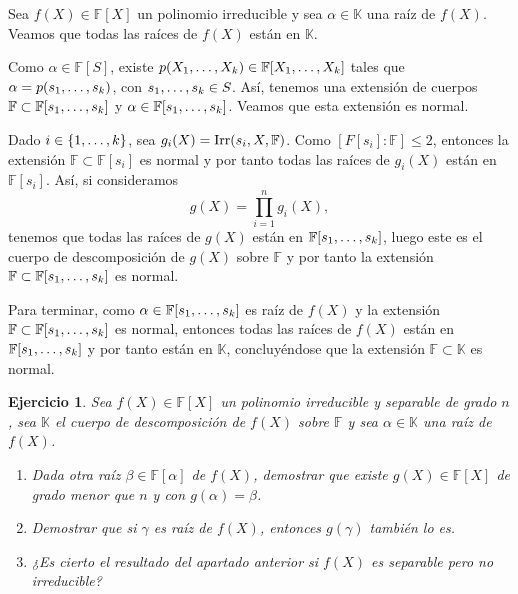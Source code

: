 \documentclass[11pt]{report}
\makeatletter
\renewenvironment{proof}[1][\proofname]{\par
  \pushQED{\qed}%
  \normalfont \topsep\z@skip %
  \trivlist
  \item[\hskip\labelsep
        \itshape
    #1\@addpunct{.}]\ignorespaces
}{%
  \popQED\endtrivlist\@endpefalse
}
\newcommand{\F}{\mathbb F}
\newcommand{\K}{\mathbb K}
\newtheorem{ejercicio}{Ejercicio}
\makeatother
\begin{document}
\begin{proof}
Sea $f(X) \in \F[X]$ un polinomio irreducible y sea $\alpha \in \K$ una raíz de $f(X)$. Veamos que todas las raíces de $f(X)$ están en $\K$.

Como $\alpha \in \F[S]$, existe $p(X_1,\mathellipsis,X_k) \in \F[X_1,\mathellipsis,X_k]$ tales que $\alpha = p(s_1,\mathellipsis,s_k)$, con $s_1,\mathellipsis,s_k \in S$. Así, tenemos una extensión de cuerpos $\F \subset \F[s_1,\mathellipsis,s_k]$ y $\alpha \in \F[s_1,\mathellipsis,s_k]$. Veamos que esta extensión es normal.

Dado $i \in \{1,\mathellipsis,k\}$, sea $g_i(X) = \textup{Irr}(s_i,X,\F)$. Como $[F[s_i] \colon \F] \leq 2$, entonces la extensión $\F \subset \F[s_i]$ es normal y por tanto todas las raíces de $g_i(X)$ están en $\F[s_i]$. Así, si consideramos
\[g(X)= \prod_{i=1}^n g_i(X),\]
tenemos que todas las raíces de $g(X)$ están en $\F[s_1,\mathellipsis,s_k]$, luego este es el cuerpo de descomposición de $g(X)$ sobre $\F$ y por tanto la extensión $\F \subset \F[s_1,\mathellipsis,s_k]$ es normal.

Para terminar, como $\alpha \in \F[s_1,\mathellipsis,s_k]$ es raíz de $f(X)$ y la extensión $\F \subset \F[s_1,\mathellipsis,s_k]$ es normal, entonces todas las raíces de $f(X)$ están en $\F[s_1,\mathellipsis,s_k]$ y por tanto están en $\K$, concluyéndose que la extensión $\F \subset \K$ es normal.
\end{proof}

\begin{ejercicio}
Sea $f(X) \in \F[X]$ un polinomio irreducible y separable de grado $n$, sea $\K$ el cuerpo de descomposición de $f(X)$ sobre $\F$ y sea $\alpha \in \K$ una raíz de $f(X)$. 
\begin{enumerate}
    \item Dada otra raíz $\beta \in \F[\alpha]$ de $f(X)$, demostrar que existe $g(X) \in \F[X]$ de grado menor que $n$ y con $g(\alpha)=\beta$.
    \item Demostrar que si $\gamma$ es raíz de $f(X)$, entonces $g(\gamma)$ también lo es.
    \item ¿Es cierto el resultado del apartado anterior si $f(X)$ es separable pero no irreducible?
\end{enumerate} 
\end{ejercicio}
\end{document}
